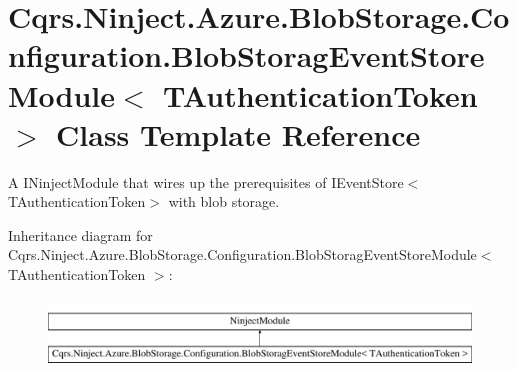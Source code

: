 \hypertarget{classCqrs_1_1Ninject_1_1Azure_1_1BlobStorage_1_1Configuration_1_1BlobStoragEventStoreModule}{}\section{Cqrs.\+Ninject.\+Azure.\+Blob\+Storage.\+Configuration.\+Blob\+Storag\+Event\+Store\+Module$<$ T\+Authentication\+Token $>$ Class Template Reference}
\label{classCqrs_1_1Ninject_1_1Azure_1_1BlobStorage_1_1Configuration_1_1BlobStoragEventStoreModule}


A I\+Ninject\+Module that wires up the prerequisites of I\+Event\+Store$<$\+T\+Authentication\+Token$>$ with blob storage.  


Inheritance diagram for Cqrs.\+Ninject.\+Azure.\+Blob\+Storage.\+Configuration.\+Blob\+Storag\+Event\+Store\+Module$<$ T\+Authentication\+Token $>$\+:\begin{figure}[H]
\begin{center}
\leavevmode
\includegraphics[height=1.882353cm]{classCqrs_1_1Ninject_1_1Azure_1_1BlobStorage_1_1Configuration_1_1BlobStoragEventStoreModule}
\end{center}
\end{figure}
